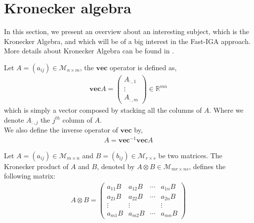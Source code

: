 \section{Kronecker algebra}
\label{sec:produit_kronecker_sec}
In this section, we present an overview about an interesting subject, which is the Kronecker Algebra, and which will be of a big interest in the Fast-IGA approach. More details about Kronecker Algebra can be found in \cite{vanloan2000,Graham_book,Bernstein_book}.

\begin{definition}
Let $A=(a_{ij}) \in \mathcal{M}_{n \times m}$, the $\mathbf{vec}$ operator is defined as,
\begin{align}
\mathbf{vec} A = \left(\begin{array}{c}
 A_{:,1}
\\
\vdots
\\
 A_{:,m}
\end{array}\right) \in \mathbb{R}^{mn}
\end{align}
which is simply a vector composed by stacking all the columns of $A$. Where we denote $ A_{:,j}$ the $j^{th}$ column of $A$.
\\
We also define the inverse operator of $\mathbf{vec}$ by,
\begin{align}
A = \mathbf{vec}^{-1} \mathbf{vec} A
\end{align}
\end{definition}

\begin{definition}
Let $A=(a_{ij}) \in \mathcal{M}_{m \times n}$ and $B=(b_{ij}) \in \mathcal{M}_{r \times s}$ be two matrices. The Kronecker product of $A$ and $B$, denoted by $A \otimes B  \in \mathcal{M}_{mr \times ns}$, defines the following matrix:
\begin{align}
A \otimes B = 
\left(\begin{array}{cccc}
a_{11}B & a_{12}B & \cdots & a_{1n}B 
\\
a_{21}B & a_{22}B & \cdots & a_{2n}B  
\\
\vdots & \vdots &  & \vdots 
\\
a_{m1}B & a_{m2}B & \cdots & a_{mn}B 
\end{array}\right)
\end{align}
\end{definition}

